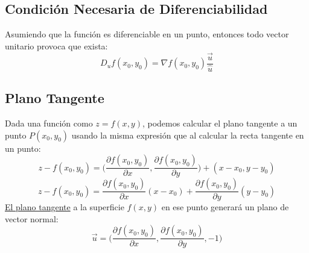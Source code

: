 \subsection{Condición Necesaria de Diferenciabilidad}
 Asumiendo que la función es diferenciable en un punto, entonces todo vector unitario provoca que exista:
\[
        \boxed{D_uf(x_0,y_0)=\nabla f(x_0,y_0)\frac{\vec{u}}{\hat{u}}}
\]
\subsection{Plano Tangente}
 Dada una función como \(z = f(x,y)\), podemos calcular el plano tangente a un punto \(P(x_0,y_0)\) usando la misma expresión que al calcular la recta tangente en un punto:
\[
        z- f(x_0,y_0) = \Big( \frac{\partial f(x_0,y_0)}{\partial x}, \frac{\partial f(x_0,y_0)}{\partial y}\Big) + (x-x_0, y-y_0)
\]
\[
        \boxed{z- f(x_0,y_0) = \frac{\partial f(x_0,y_0)}{\partial x}(x-x_0)+ \frac{\partial f(x_0,y_0)}{\partial y}(y-y_0)}
\]
 \underline{El plano tangente} a la superficie \(f(x,y)\) en ese punto generará un plano de vector normal:
\[
        \boxed{\vec{u} = \Big(\frac{\partial f(x_0,y_0)}{\partial x},\frac{\partial f(x_0,y_0)}{\partial y},-1\Big)}
\]

